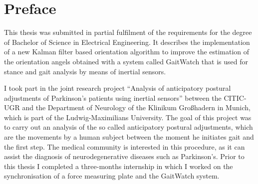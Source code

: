 \chapter*{Preface}

This thesis was submitted in partial fulfilment of the requirements for the degree of Bachelor of Science in Electrical Engineering. It describes the implementation of a new Kalman filter based orientation algorithm to improve the estimation of the orientation angels obtained with a system called GaitWatch that is used for stance and gait analysis by means of inertial sensors.

I took part in the joint research project “Analysis of anticipatory postural adjustments of Parkinson’s patients using inertial sensors” between the \gls{CITIC-UGR} and the Department of Neurology of the Klinikum Großhadern in Munich, which is part of the Ludwig-Maximilians University. The goal of this project was to carry out an analysis of the so called anticipatory postural adjustments, which are the movements by a human subject between the moment he initiates gait and the first step. The medical community is interested in this procedure, as it can assist the diagnosis of neurodegenerative diseases such as Parkinson's. Prior to this thesis I completed a three-months internship in which I worked on the synchronisation of a force measuring plate and the GaitWatch system.